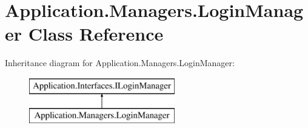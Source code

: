 \hypertarget{class_application_1_1_managers_1_1_login_manager}{}\section{Application.\+Managers.\+Login\+Manager Class Reference}
\label{class_application_1_1_managers_1_1_login_manager}
Inheritance diagram for Application.\+Managers.\+Login\+Manager\+:\begin{figure}[H]
\begin{center}
\leavevmode
\includegraphics[height=2.000000cm]{class_application_1_1_managers_1_1_login_manager}
\end{center}
\end{figure}
